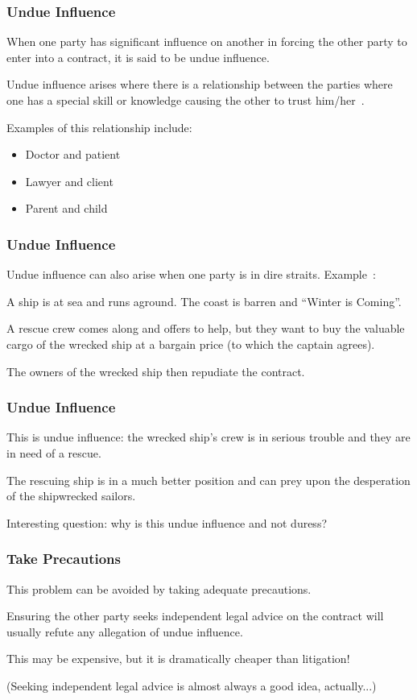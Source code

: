 \begin{frame}
\frametitle{Undue Influence}

When one party has significant influence on another in forcing the other party to enter into a contract, it is said to be undue influence.

Undue influence arises where there is a relationship between the parties where one has a special skill or knowledge causing the other to trust him/her~\cite{lba}.

Examples of this relationship include:
\begin{itemize}
	\item Doctor and patient
	\item Lawyer and client
	\item Parent and child
\end{itemize}

\end{frame}



\begin{frame}
\frametitle{Undue Influence}

Undue influence can also arise when one party is in dire straits. Example~\cite{lba}:

A ship is at sea and runs aground. The coast is barren and ``Winter is Coming''.

A rescue crew comes along and offers to help, but they want to buy the valuable cargo of the wrecked ship at a bargain price (to which the captain agrees).

The owners of the wrecked ship then repudiate the contract.

\end{frame}



\begin{frame}
\frametitle{Undue Influence}

This is undue influence: the wrecked ship's crew is in serious trouble and they are in need of a rescue.

The rescuing ship is in a much better position and can prey upon the desperation of the shipwrecked sailors.

Interesting question: why is this undue influence and not duress?

\end{frame}



\begin{frame}
\frametitle{Take Precautions}

This problem can be avoided by taking adequate precautions.

Ensuring the other party seeks independent legal advice on the contract will usually refute any allegation of undue influence.

This may be expensive, but it is dramatically cheaper than litigation!

(Seeking independent legal advice is almost always a good idea, actually...)


\end{frame}

